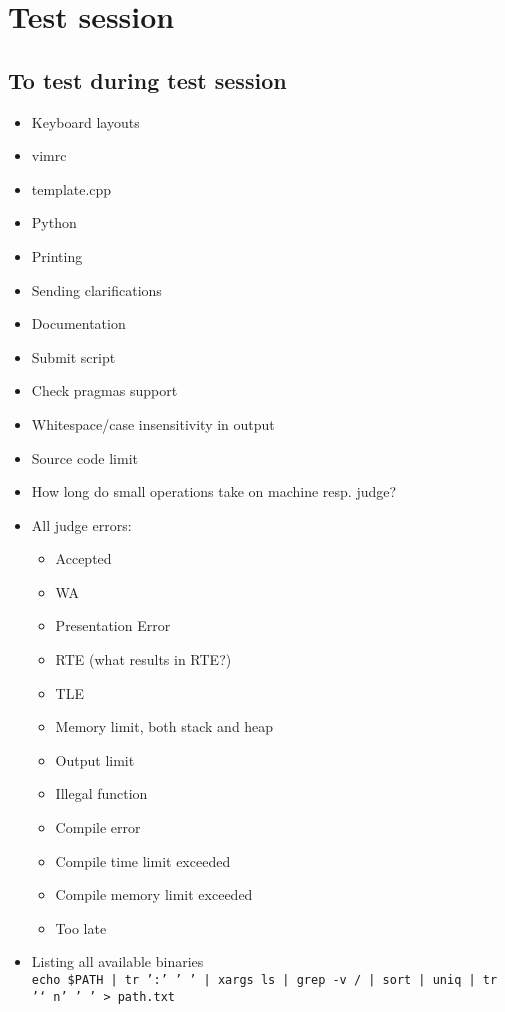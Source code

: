 \chapter{Test session}

\section{To test during test session}
\begin{itemize}
	\item Keyboard layouts
	\item vimrc
	\item template.cpp
	\item Python
	\item Printing
	\item Sending clarifications
	\item Documentation
	\item Submit script
	\item Check pragmas support
	\item Whitespace/case insensitivity in output
	\item Source code limit
	\item How long do small operations take on machine resp. judge?
	\item All judge errors:
		\begin{itemize}
			\item Accepted
			\item WA
			\item Presentation Error
			\item RTE (what results in RTE?)
			\item TLE
			\item Memory limit, both stack and heap
			\item Output limit
			\item Illegal function
			\item Compile error
			\item Compile time limit exceeded
			\item Compile memory limit exceeded
			\item Too late
		\end{itemize}
	\item Listing all available binaries\\
		\texttt{echo \$PATH | tr ':' ' ' | xargs ls | grep -v / | sort | uniq | tr '\char`\\n' ' ' > path.txt}
\end{itemize}

